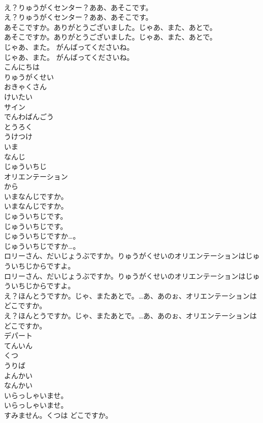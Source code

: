 \documentclass[8pt]{extreport}
\begin{document}
\begin{CJK}{UTF8}{min}
\\	え？りゅうがくセンター？ああ、あそこです。	
\\	え？りゅうがくセンター？ああ、あそこです。 
\\	あそこですか。ありがとうございました。じゃあ、また、あとで。	
\\	あそこですか。ありがとうございました。じゃあ、また、あとで。 
\\	じゃあ、また。 がんばってくださいね。	
\\	じゃあ、また。 がんばってくださいね。 
\\	こんにちは
\\	りゅうがくせい
\\	おきゃくさん
\\	けいたい
\\	サイン
\\	でんわばんごう
\\	とうろく
\\	うけつけ
\\	いま
\\	なんじ
\\	じゅういちじ
\\	オリエンテーション
\\	から
\\	いまなんじですか。	
\\	いまなんじですか。 
\\	じゅういちじです。	
\\	じゅういちじです。 
\\	じゅういちじですか…。	
\\	じゅういちじですか…。 
\\	ロリーさん、だいじょうぶですか。りゅうがくせいのオリエンテーションはじゅういちじからですよ。	
\\	ロリーさん、だいじょうぶですか。りゅうがくせいのオリエンテーションはじゅういちじからですよ。 
\\	え？ほんとうですか。じゃ、またあとで。…あ、あのぉ、オリエンテーションはどこですか。	
\\	え？ほんとうですか。じゃ、またあとで。…あ、あのぉ、オリエンテーションはどこですか。 
\\	デパート
\\	てんいん
\\	くつ
\\	うりば
\\	よんかい
\\	なんかい
\\	いらっしゃいませ。	
\\	いらっしゃいませ。 
\\	すみません。くつは どこですか。	

\end{CJK}
\end{document}
